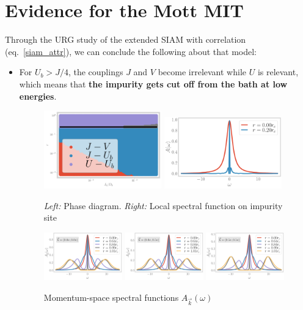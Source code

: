 \documentclass{report}
\numberwithin{equation}{section}
\begin{document}
\section{Evidence for the Mott MIT}
Through the URG study of the extended SIAM with correlation (eq.~\ref{siam_attr}), we can conclude the following about that model:
\begin{itemize}
	\item For \(U_b > J/4\), the couplings \(J\) and \(V\) become irrelevant while \(U\) is relevant, which means that \textbf{the impurity gets cut off from the bath at low energies}.
\begin{figure}[htpb]
	\centering
	\includegraphics[width=0.48\textwidth]{../figures/phase-map-MIT.pdf}
	\includegraphics[width=0.48\textwidth]{../figures/spectral-function-(0, 0).pdf}
	\caption{{\it Left:} Phase diagram. {\it Right:} Local spectral function on impurity site}
	\label{spec_func_mit}
\end{figure}
\begin{figure}[htpb]
	\centering
	\includegraphics[width=0.32\textwidth]{../figures/kspace_specfunc_0.0000_0.0000.pdf}
	\includegraphics[width=0.32\textwidth]{../figures/kspace_specfunc_0.0000_1.5708.pdf}
	\includegraphics[width=0.32\textwidth]{../figures/kspace_specfunc_1.5708_1.5708.pdf}
	\caption{Momentum-space spectral functions \(A_{\vec k}(\omega)\)}
\end{figure}


\end{itemize}
\end{document}
